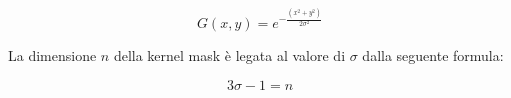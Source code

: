 \begin{equation}
G(x, y) = e^{- \frac{(x^2 + y^2)}{2\sigma^2}}
\end{equation}

La dimensione $n$ della kernel mask è legata al valore di $\sigma$ dalla seguente formula:

\begin{equation}
3\sigma - 1 = n
\end{equation}

